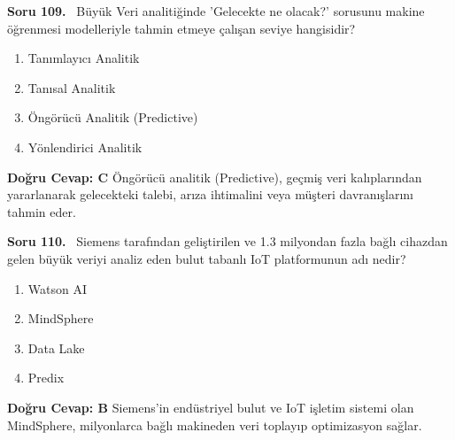 \documentclass[11pt,a4paper,openany]{book}
\begin{document}
\needspace{5cm}
\vspace{8pt}
\noindent\textbf{\large\sffamily Soru 109.} \ Büyük Veri analitiğinde 'Gelecekte ne olacak?' sorusunu makine öğrenmesi modelleriyle tahmin etmeye çalışan seviye hangisidir?
\begin{enumerate}[label=\Alph*), leftmargin=25pt, topsep=4pt, itemsep=2pt]
    \item Tanımlayıcı Analitik
    \item Tanısal Analitik
    \item Öngörücü Analitik (Predictive)
    \item Yönlendirici Analitik
\end{enumerate}
\vspace{4pt}
\begin{tcolorbox}[title=Cevap ve Açıklama, colback=gray!3!white, colframe=primarycolor!90!black, arc=2mm, fonttitle=\bfseries\sffamily, top=6pt, bottom=6pt]
    \textbf{Doğru Cevap: C}
    \vspace{2pt}
    Öngörücü analitik (Predictive), geçmiş veri kalıplarından yararlanarak gelecekteki talebi, arıza ihtimalini veya müşteri davranışlarını tahmin eder.
\end{tcolorbox}
\vspace{10pt}

\needspace{5cm}
\vspace{8pt}
\noindent\textbf{\large\sffamily Soru 110.} \ Siemens tarafından geliştirilen ve 1.3 milyondan fazla bağlı cihazdan gelen büyük veriyi analiz eden bulut tabanlı IoT platformunun adı nedir?
\begin{enumerate}[label=\Alph*), leftmargin=25pt, topsep=4pt, itemsep=2pt]
    \item Watson AI
    \item MindSphere
    \item Data Lake
    \item Predix
\end{enumerate}
\vspace{4pt}
\begin{tcolorbox}[title=Cevap ve Açıklama, colback=gray!3!white, colframe=primarycolor!90!black, arc=2mm, fonttitle=\bfseries\sffamily, top=6pt, bottom=6pt]
    \textbf{Doğru Cevap: B}
    \vspace{2pt}
    Siemens'in endüstriyel bulut ve IoT işletim sistemi olan MindSphere, milyonlarca bağlı makineden veri toplayıp optimizasyon sağlar.
\end{tcolorbox}
\vspace{10pt}
\end{document}
